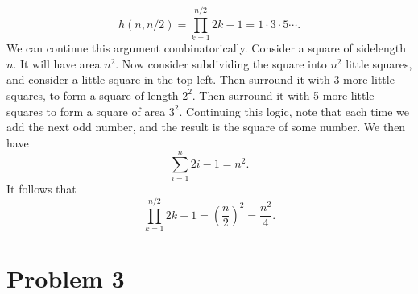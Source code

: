 \documentclass[11pt, letterpaper]{report}
\begin{document}
\begin{enumerate}
		\[
			h(n,n /2)=\prod_{k=1}^{n /2}2k-1=1\cdot 3\cdot 5\cdots
		.\]
		We can continue this argument combinatorically. Consider a square of sidelength $n$. It will have area $n^2$. Now consider subdividing the square into $n^2$ little squares, and consider a little square in the top left. Then surround it with 3 more little squares, to form a square of length $2^2$. Then surround it with 5 more little squares to form a square of area $3^2$. Continuing this logic, note that each time we add the next odd number, and the result is the square of some number. We then have
		\[
			\sum_{i=1}^{n} 2i-1=n^2
		.\]
		It follows that
		\[
			\prod_{k=1}^{n /2}2k-1=\left( \frac{n}{2} \right) ^2=\frac{n^2}{4}
		.\]
\end{enumerate}
\section*{Problem 3}
\end{document}
